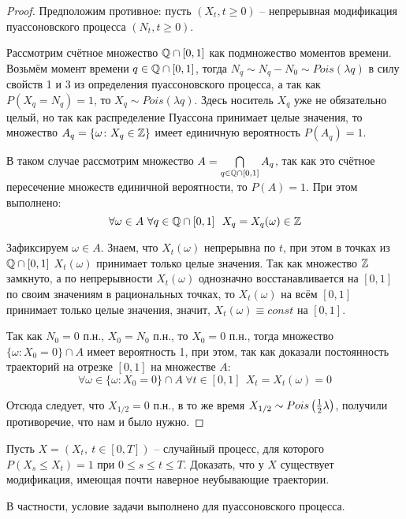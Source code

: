 \begin{proof}
    Предположим противное: пусть $(X_t, t \ge 0)$ -- непрерывная модификация пуассоновского процесса $(N_t, t \ge 0)$.

    Рассмотрим счётное множество $\mathbb{Q} \cap [0, 1]$ как подмножество моментов времени. Возьмём момент времени $q \in \mathbb{Q} \cap [0, 1]$, тогда $N_q \sim N_q - N_0 \sim Pois(\lambda q)$ в силу свойств 1 и 3 из определения пуассоновского процесса, а так как $P(X_q = N_q) = 1$, то $X_q \sim Pois(\lambda q)$. Здесь носитель $X_q$ уже не обязательно целый, но так как распределение Пуассона принимает целые значения, то множество $A_q = \{\omega \colon X_q \in \mathbb{Z}\}$ имеет единичную вероятность $P(A_q) = 1$.

    В таком случае рассмотрим множество $A = \bigcap\limits_{q \in \mathbb{Q} \cap [0, 1]} A_q$, так как это счётное пересечение множеств единичной вероятности, то $P(A) = 1$. При этом выполнено:
    \[
        \forall \omega \in A \ \forall q \in \Q \cap [0, 1] \ \ X_q = X_q(\omega) \in \Z
    \]

    Зафиксируем $\omega \in A$. Знаем, что $X_t(\omega)$ непрерывна по $t$, при этом в точках из $\mathbb{Q} \cap [0, 1]$ $X_t(\omega)$ принимает только целые значения. Так как множество $\mathbb{Z}$ замкнуто, а по непрерывности $X_t(\omega)$ однозначно восстанавливается на $[0, 1]$ по своим значениям в рациональных точках, то $X_t(\omega)$ на всём $[0, 1]$ принимает только целые значения, значит, $X_t(\omega) \equiv const$ на $[0, 1]$.

    Так как $N_0 = 0$ п.н., $X_0 = N_0$ п.н., то $X_0 = 0$ п.н., тогда множество $\{\omega \colon X_0 = 0\} \cap A$ имеет вероятность 1, при этом, так как доказали постоянность траекторий на отрезке $[0, 1]$ на множестве $A$:
    \[
        \forall \omega \in \{\omega \colon X_0 = 0\} \cap A \ \forall t \in [0, 1] \ \ X_t = X_t(\omega) = 0 
    \]

    Отсюда следует, что $X_{1/2} = 0$ п.н., в то же время $X_{1/2} \sim Pois\left(\frac{1}{2} \lambda\right)$, получили противоречие, что нам и было нужно.    
\end{proof}

\begin{problem}
    Пусть $X = (X_t,\ t \in [0, T])$ -- случайный процесс, для которого $P(X_s \le X_t) = 1$ при $0 \le s \le t \le T$. Доказать, что у $X$ существует модификация, имеющая почти наверное неубывающие траектории.
\end{problem}

\begin{note}
    В частности, условие задачи выполнено для пуассоновского процесса.
\end{note}

